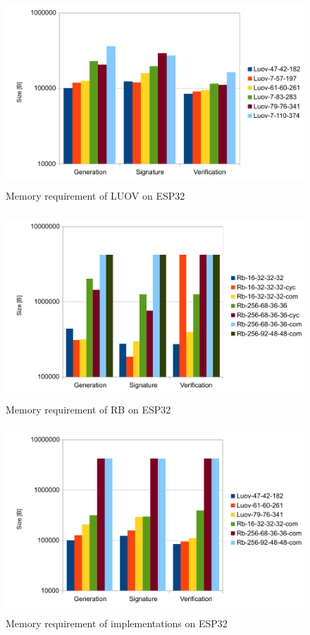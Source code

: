 \documentclass[thesis=M,english]{FITthesis}[2019/12/23]
\begin{document}
\begin{figure}[H]
\centering
\includegraphics[width=13cm,height=7cm]{images/mem-luov.pdf}
\caption{Memory requirement of LUOV on ESP32}
\label{mem-luov}
\end{figure}

\begin{figure}[H]
\centering
\includegraphics[width=13cm,height=7cm]{images/mem-rb.pdf}
\caption{Memory requirement of RB on ESP32}
\label{mem-rb}
\end{figure}

\begin{figure}[H]
\centering
\includegraphics[width=13cm,height=7cm]{images/mem-both.pdf}
\caption{Memory requirement of implementations on ESP32}
\label{mem-both}
\end{figure}
\end{document}
